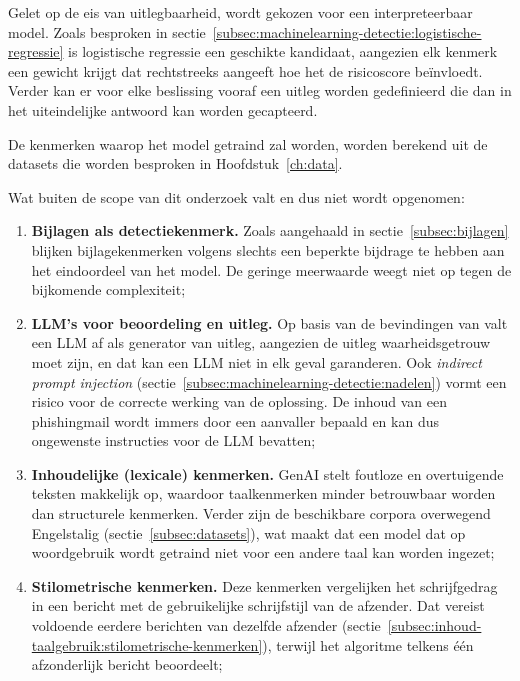 Gelet op de eis van uitlegbaarheid, wordt gekozen voor een interpreteerbaar model. Zoals besproken in sectie~\ref{subsec:machinelearning-detectie:logistische-regressie} is logistische regressie een geschikte kandidaat, aangezien elk kenmerk een gewicht krijgt dat rechtstreeks aangeeft hoe het de risicoscore beïnvloedt. Verder kan er voor elke beslissing vooraf een uitleg worden gedefinieerd die dan in het uiteindelijke antwoord kan worden gecapteerd.

De kenmerken waarop het model getraind zal worden, worden berekend uit de datasets die worden besproken in Hoofdstuk~\ref{ch:data}.

Wat buiten de scope van dit onderzoek valt en dus niet wordt opgenomen:
\begin{enumerate}
    \item \textbf{Bijlagen als detectiekenmerk.} Zoals aangehaald in sectie~\ref{subsec:bijlagen} blijken bijlagekenmerken volgens \textcite{Mendes2025} slechts een beperkte bijdrage te hebben aan het eindoordeel van het model. De geringe meerwaarde weegt niet op tegen de bijkomende complexiteit;
    \item \textbf{LLM's voor beoordeling en uitleg.} Op basis van de bevindingen van \textcite{Turpin2023} valt een LLM af als generator van uitleg, aangezien de uitleg waarheidsgetrouw moet zijn, en dat kan een LLM niet in elk geval garanderen. Ook \emph{indirect prompt injection} \autocite{Greshake2023} (sectie~\ref{subsec:machinelearning-detectie:nadelen}) vormt een risico voor de correcte werking van de oplossing. De inhoud van een phishingmail wordt immers door een aanvaller bepaald en kan dus ongewenste instructies voor de LLM bevatten;
    \item \textbf{Inhoudelijke (lexicale) kenmerken.} GenAI stelt foutloze en overtuigende teksten makkelijk op, waardoor taalkenmerken minder betrouwbaar worden dan structurele kenmerken. Verder zijn de beschikbare corpora overwegend Engelstalig \autocite{Pajola2025} (sectie~\ref{subsec:datasets}), wat maakt dat een model dat op woordgebruik wordt getraind niet voor een andere taal kan worden ingezet;
    \item \textbf{Stilometrische kenmerken.} Deze kenmerken vergelijken het schrijfgedrag in een bericht met de gebruikelijke schrijfstijl van de afzender. Dat vereist voldoende eerdere berichten van dezelfde afzender \autocite{Stringhini2014} (sectie~\ref{subsec:inhoud-taalgebruik:stilometrische-kenmerken}), terwijl het algoritme telkens één afzonderlijk bericht beoordeelt;

\end{enumerate}
